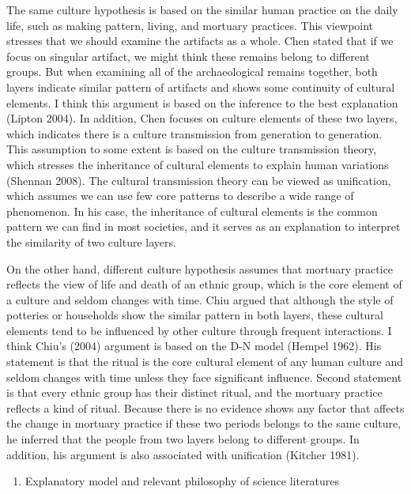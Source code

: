 \documentclass[10pt]{article}
\begin{document}
The same culture hypothesis is based on the similar human practice on
the daily life, such as making pattern, living, and mortuary practices.
This viewpoint stresses that we should examine the artifacts as a whole.
Chen stated that if we focus on singular artifact, we might think these
remains belong to different groups. But when examining all of the
archaeological remains together, both layers indicate similar pattern of
artifacts and shows some continuity of cultural elements. I think this
argument is based on the inference to the best explanation (Lipton
2004). In addition, Chen focuses on culture elements of these two
layers, which indicates there is a culture transmission from generation
to generation. This assumption to some extent is based on the culture
transmission theory, which stresses the inheritance of cultural elements
to explain human variations (Shennan 2008). The cultural transmission
theory can be viewed as unification, which assumes we can use few core
patterns to describe a wide range of phenomenon. In his case, the
inheritance of cultural elements is the common pattern we can find in
most societies, and it serves as an explanation to interpret the
similarity of two culture layers.

On the other hand, different culture hypothesis assumes that mortuary
practice reflects the view of life and death of an ethnic group, which
is the core element of a culture and seldom changes with time. Chiu
argued that although the style of potteries or households show the
similar pattern in both layers, these cultural elements tend to be
influenced by other culture through frequent interactions. I think
Chiu's (2004) argument is based on the D-N model (Hempel 1962). His
statement is that the ritual is the core cultural element of any human
culture and seldom changes with time unless they face significant
influence. Second statement is that every ethnic group has their
distinct ritual, and the mortuary practice reflects a kind of ritual.
Because there is no evidence shows any factor that affects the change in
mortuary practice if these two periods belongs to the same culture, he
inferred that the people from two layers belong to different groups. In
addition, his argument is also associated with unification (Kitcher
1981).

\begin{enumerate}
\def\labelenumi{\arabic{enumi}.}
\setcounter{enumi}{1}
\itemsep1pt\parskip0pt
\item
  Explanatory model and relevant philosophy of science literatures
\end{enumerate}
\end{document}
